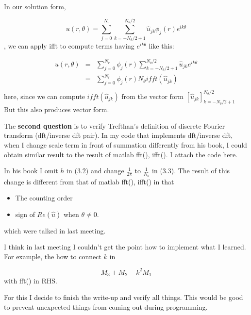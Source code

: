 \documentclass[11pt,letterpaper]{article}
\begin{document}
In our solution form,

\begin{equation} u(r,\theta) = \sum_{j=0}^{N_r}
\sum_{k=-N_\theta/2+1}^{N_\theta/2} \hat{u}_{jk} \phi_j(r)
e^{ik\theta} \end{equation}, we can apply ifft to compute terms
having $e^{ik\theta}$ like this:

\begin{eqnarray}
u(r,\theta) &=& \sum_{j=0}^{N_r} \phi_j(r) \sum_{k=-N_\theta/2+1}^{N_\theta/2} \hat{u}_{jk} e^{ik\theta} \\
        &=& \sum_{j=0}^{N_r} \phi_j(r) N_\theta ifft(\hat{u}_{jk})\\
\end{eqnarray} here, since we can compute $ifft(\hat{u}_{jk})$
from the vector form $[\hat{u}_{jk}]_{k=-N_\theta/2 +
1}^{N_\theta/2}$ But this also produces vector form.

The \textbf{second question} is to verify Trefthan's definition of
discrete Fourier transform (dft/inverse dft pair). In my code that
implements dft/inverse dft, when I change scale term in front of
summation differently from his book, I could obtain similar result
to the result of matlab fft(), ifft(). I attach the code here.

In his book I omit $h$ in (3.2) and change $\frac{1}{2\pi}$ to
$\frac{1}{N_\theta}$ in (3.3). The result of this change is
different from that of matlab fft(), ifft() in that

\begin{itemize} \item The counting order \item sign of $Re(\hat
u)$ when $\theta \ne 0$.\end{itemize} which were talked in last
meeting.

I think in last meeting I couldn't get the point how to implement
what I learned. For example, the how to connect $k$ in

\begin{equation} M_3 + M_2 -k^2 M_1 \end{equation} with fft() in
RHS.

For this I decide to finish the write-up and verify all things.
This would be good to prevent unexpected things from coming out
during programming.


 
\end{document}
